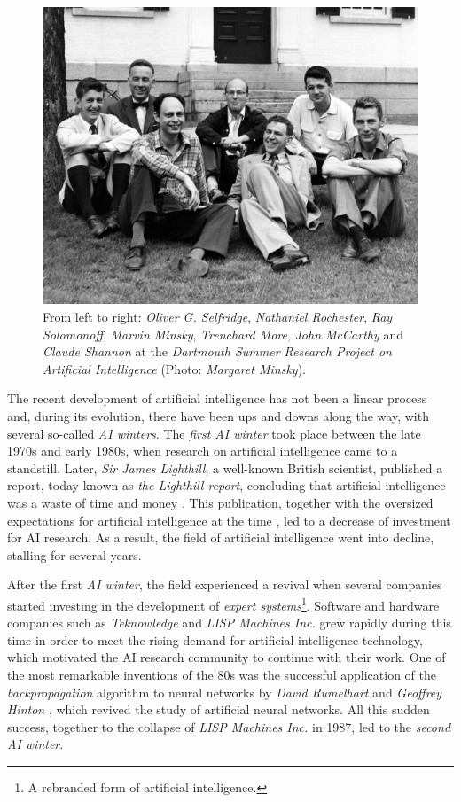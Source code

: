 \begin{figure}[h!]
	\centering
	\includegraphics[width=.6\textwidth]{introduction/images/dartmouth}
	\caption[\textit{Dartmouth Summer Research Project on Artificial Intelligence}]{From left to right: \textit{Oliver G. Selfridge}, \textit{Nathaniel Rochester}, \textit{Ray Solomonoff}, \textit{Marvin Minsky}, \textit{Trenchard More}, \textit{John McCarthy} and \textit{Claude Shannon} at the \textit{Dartmouth Summer Research Project on Artificial Intelligence} (Photo: \textit{Margaret Minsky}).}
	\label{fig:dartmouth_photo}
\end{figure}

The recent development of artificial intelligence has not been a linear process and, during its evolution, there have been ups and downs along the way, with several so-called \textit{AI winters}. The \textit{first AI winter} took place between the late 1970s and early 1980s, when research on artificial intelligence came to a standstill. Later, \textit{Sir James Lighthill}, a well-known British scientist, published a report, today known as \textit{the Lighthill report}, concluding that artificial intelligence was a waste of time and money \autocite{lighthillReport}. This publication, together with the oversized expectations for artificial intelligence at the time \autocite{russellNorvig}, led to a decrease of investment for AI research. As a result, the field of artificial intelligence went into decline, stalling for several years.

After the first \textit{AI winter}, the field experienced a revival when several companies started investing in the development of \textit{expert systems}\footnote{A rebranded form of artificial intelligence.}. Software and hardware companies such as \textit{Teknowledge} and \textit{LISP Machines Inc.} grew rapidly during this time in order to meet the rising demand for artificial intelligence technology, which motivated the AI research community to continue with their work. One of the most remarkable inventions of the 80s was the successful application of the \textit{backpropagation} algorithm to neural networks by \textit{David Rumelhart} and \textit{Geoffrey Hinton} \autocite{hinton1986}, which revived the study of artificial neural networks. All this sudden success, together to the collapse of \textit{LISP Machines Inc.} in 1987, led to the \textit{second AI winter}.

